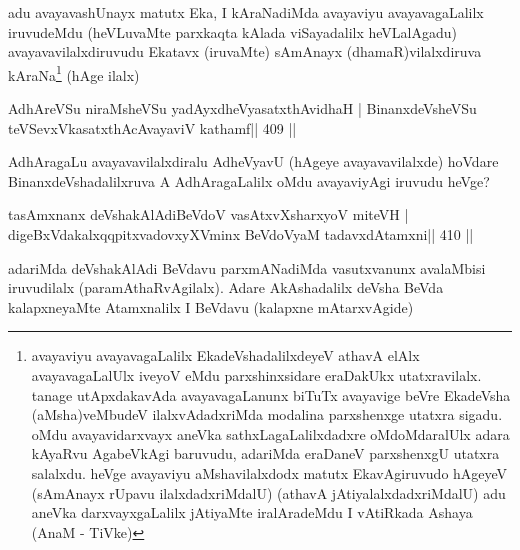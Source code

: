 \begin{artha}
adu avayavashUnayx matutx Eka, I kAraNadiMda avayaviyu avayavagaLalilx 
iruvudeMdu (heVLuvaMte parxkaqta kAlada viSayadalilx heVLalAgadu) 
avayavavilalxdiruvudu Ekatavx (iruvaMte) sAmAnayx (dhamaR)vilalxdiruva 
kAraNa\footnote[1]{avayaviyu avayavagaLalilx EkadeVshadalilxdeyeV 
athavA elAlx avayavagaLalUlx iveyoV eMdu parxshinxsidare eraDakUkx 
utatxravilalx. tanage utApxdakavAda avayavagaLanunx biTuTx avayavige 
beVre EkadeVsha (aMsha)veMbudeV ilalxvAdadxriMda modalina parxshenxge 
utatxra sigadu. oMdu avayavidarxvayx aneVka sathxLagaLalilxdadxre oMdoMdaralUlx adara kAyaRvu AgabeVkAgi baruvudu, adariMda eraDaneV parxshenxgU utatxra salalxdu. heVge avayaviyu aMshavilalxdodx matutx EkavAgiruvudo hAgeyeV (sAmAnayx rUpavu ilalxdadxriMdalU) (athavA jAtiyalalxdadxriMdalU) adu aneVka darxvayxgaLalilx jAtiyaMte iralAradeMdu I vAtiRkada Ashaya (AnaM - TiVke)} (hAge ilalx) 
\end{artha}

\begin{shl}
\footnotemark[2]AdhAreVSu niraMsheVSu yadAyxdheVyasatxthAvidhaH |
BinanxdeVsheVSu teVSevxVkasatxthAcAvayaviV kathamf\hfill || 409 ||
\end{shl}

\begin{artha}
AdhAragaLu avayavavilalxdiralu AdheVyavU (hAgeye avayavavilalxde) hoVdare BinanxdeVshadalilxruva A AdhAragaLalilx oMdu avayaviyAgi iruvudu heVge?
\end{artha}

\begin{shl}
tasAmxnanx deVshakAlAdiBeVdoV vasAtxvXsharxyoV miteVH |
digeBxVdakalxqqpitxvadovxyXVminx BeVdoV\s yaM tadavxdAtamxni\hfill || 410 ||
\end{shl}

\begin{artha}
adariMda deVshakAlAdi BeVdavu parxmANadiMda vasutxvanunx avalaMbisi 
iruvudilalx (paramAthaRvAgilalx). Adare AkAshadalilx deVsha BeVda 
kalapxneyaMte Atamxnalilx I BeVdavu (kalapxne mAtarxvAgide)
\end{artha}

